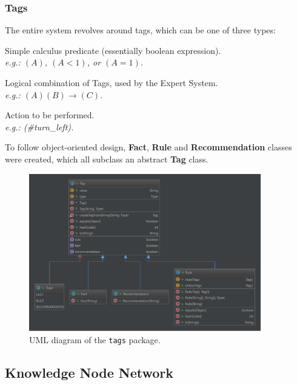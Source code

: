 \documentclass{beamer}
\newcommand{\code}[1]{\texttt{#1}}
\begin{document}
	\begin{frame}
		\frametitle{Tags}
		The entire system revolves around tags, which can be one of three types:
		\begin{description}[Recommendation]
			\item[Fact] Simple calculus predicate (essentially boolean expression). \\
						\emph{e.g.: $(A)$, $(A < 1)$, or $(A = 1)$.}
			\item[Rule] Logical combination of Tags, used by the Expert System. \\
						\emph{e.g.: $(A)(B)\rightarrow(C)$.}
			\item[Recommendation] Action to be performed. \\
								  \emph{e.g.: (\#turn\_left).}
		\end{description}
		To follow object-oriented design, \textbf{Fact}, \textbf{Rule} and \textbf{Recommendation} classes were created, which all subclass an abstract \textbf{Tag} class.
	\end{frame}

	\begin{frame}
		\begin{figure}
			\centering
			\includegraphics[width=0.9\textwidth]{figures/uml_tags.pdf}
			\caption
			{UML diagram of the \code{tags} package.}
			\label{fig:uml_tags}
		\end{figure}
	\end{frame}
	
	\subsection{Knowledge Node Network}
	
\end{document}
